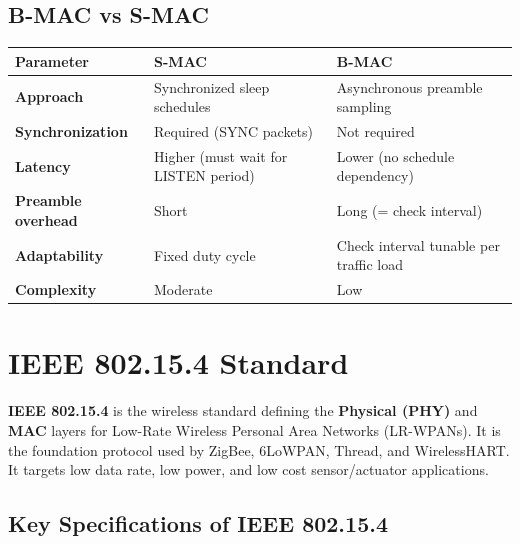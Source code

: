 \documentclass[12pt,a4paper]{article}
\renewcommand{\arraystretch}{1.45}
\begin{document}
\subsection{B-MAC vs S-MAC}

\par\noindent
{\renewcommand{\arraystretch}{1.5}%
\begin{tabularx}{\linewidth}{|B{3.0cm}|Y|Y|}
\hline
\textbf{Parameter} & \textbf{S-MAC} & \textbf{B-MAC} \\
\hline
\textbf{Approach} & Synchronized sleep schedules & Asynchronous preamble sampling \\
\hline
\textbf{Synchronization} & Required (SYNC packets) & Not required \\
\hline
\textbf{Latency} & Higher (must wait for LISTEN period) & Lower (no schedule dependency) \\
\hline
\textbf{Preamble overhead} & Short & Long (= check interval) \\
\hline
\textbf{Adaptability} & Fixed duty cycle & Check interval tunable per traffic load \\
\hline
\textbf{Complexity} & Moderate & Low \\
\hline
\end{tabularx}}

\section{IEEE 802.15.4 Standard}

\begin{tcolorbox}[defbox, title={\textbf{IEEE 802.15.4 --- Definition}}]
\textbf{IEEE 802.15.4} is the wireless standard defining the \textbf{Physical (PHY)} and \textbf{MAC} layers for Low-Rate Wireless Personal Area Networks (LR-WPANs). It is the foundation protocol used by ZigBee, 6LoWPAN, Thread, and WirelessHART. It targets low data rate, low power, and low cost sensor/actuator applications.
\end{tcolorbox}

\subsection{Key Specifications of IEEE 802.15.4}
\end{document}

